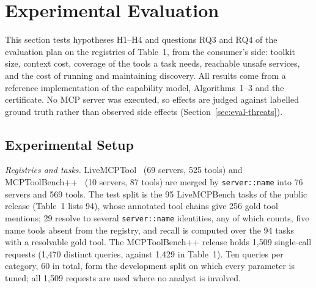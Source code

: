 \section{Experimental Evaluation}
\label{sec:eval}

This section tests hypotheses H1--H4 and questions RQ3 and RQ4 of the evaluation plan on the registries of
Table~1, from the consumer's side: toolkit size, context cost, coverage of the tools a task needs, reachable
unsafe services, and the cost of running and maintaining discovery. All results come from a
reference implementation of the capability model, Algorithms~1--3 and the certificate. No MCP server was
executed, so effects are judged against labelled ground truth rather than observed side effects
(Section~\ref{sec:eval-threats}).

\subsection{Experimental Setup}
\label{sec:eval-setup}

\emph{Registries and tasks.} LiveMCPTool~\cite{mo2025livemcpbench} (69 servers, 525 tools) and
MCPToolBench++~\cite{fan2025mcptoolbench} (10 servers, 87 tools) are merged by \texttt{server::name} into 76
servers and 569 tools. The test split is the 95 LiveMCPBench tasks of the public release (Table~1 lists 94),
whose annotated tool chains give 256 gold tool mentions; 29 resolve to several \texttt{server::name}
identities, any of which counts, five name tools absent from the registry, and recall is computed over the 94
tasks with a resolvable gold tool. The MCPToolBench++ release holds 1,509 single-call requests (1,470 distinct
queries, against 1,429 in Table~1). Ten queries per category, 60 in total, form the development split on
which every parameter is tuned; all 1,509 requests are used where no analyst is involved.

